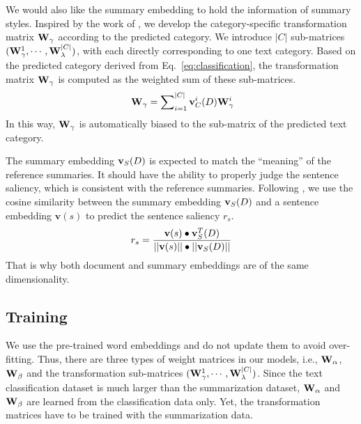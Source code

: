 \documentclass[letterpaper]{article}
\begin{document}
We would also like the summary embedding to hold the information of summary styles. 
Inspired by the work of \cite{dong2014adaptive}, we develop the category-specific transformation matrix ${\bf{W}}_\gamma$ according to the predicted category.
We introduce $|C|$ sub-matrices $({\bf{W}}_\gamma ^1, \cdots ,{\bf{W}}_\lambda ^{|C|})$, with each directly corresponding to one text category.
Based on the predicted category derived from Eq.~\ref{eq:classification}, the transformation matrix ${\bf{W}}_\gamma$ is computed as the weighted sum of these sub-matrices.
\begin{equation}~\label{eq:adaptive}
{{\bf{W}}_\gamma } = \sum\nolimits_{i = 1}^{|C|} {{\bf{v}}_C^i(D)} {\bf{W}}_\gamma ^i
\end{equation}
In this way, ${{\bf{W}}_\gamma }$ is automatically biased to the sub-matrix of the predicted text category.

The summary embedding ${\bf{v}}_S(D)$ is expected to match the ``meaning'' of the reference summaries.
It should have the ability to properly judge the sentence saliency, which is consistent with the reference summaries.
Following \cite{kobayashi-noguchi-yatsuka:2015:EMNLP}, we use the cosine similarity between the summary embedding ${\bf{v}}_S(D)$ and a sentence embedding ${\mathbf{v}}(s)$ to predict the sentence saliency $r_s$.
\begin{equation} \label{EQ:similarity}
r_s= \frac{{{\bf{v}}(s) \bullet {\bf{v}}_S^T(D)}}{{||{\bf{v}}(s)|| \bullet ||{{\bf{v}}_S}(D)||}}
\end{equation}
That is why both document and summary embeddings are of the same dimensionality.

\subsection{Training}\label{SC:training}
We use the pre-trained word embeddings and do not update them to avoid over-fitting.
Thus, there are three types of weight matrices in our models, i.e., ${{\bf{W}}_\alpha }$, ${{\bf{W}}_\beta }$ and the transformation sub-matrices $({\bf{W}}_\gamma ^1, \cdots ,{\bf{W}}_\lambda ^{|C|})$.
Since the text classification dataset is much larger than the summarization dataset, ${{\bf{W}}_\alpha }$ and ${{\bf{W}}_\beta }$ are learned from the classification data only.
Yet, the transformation matrices have to be trained with the summarization data.
\end{document}
